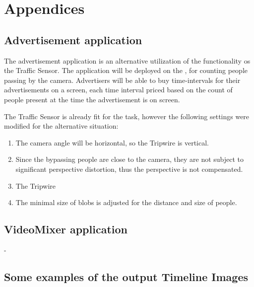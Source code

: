 \appendix
\chapter*{Appendices}\label{chap:Appendices}
\setcounter{chapter}{1}  %
\setcounter{equation}{0} 

\section{Advertisement application}
The advertisement application is an alternative utilization of the functionality os the Traffic Sensor.
The application will be deployed on the \viktanszek, for counting people passing by the camera.
Advertisers will be able to buy time-intervals for their advertisements on a screen, each time interval priced based on the count of people present at the time the advertisement is on screen.

The Traffic Sensor is already fit for the task, however the following settings were modified for the alternative situation:
\begin{enumerate}
	\item The camera angle will be horizontal, so the Tripwire is vertical.
	\item Since the bypassing people are close to the camera, they are not subject to significant  perspective distortion, thus the perspective is not compensated.
	\item The Tripwire
	\item The minimal size of blobs is adjusted for the distance and size of people.
\end{enumerate}

\clearpage\section{VideoMixer application}
-

\clearpage\section{Some examples of the output Timeline Images}\label{app:TIs}

